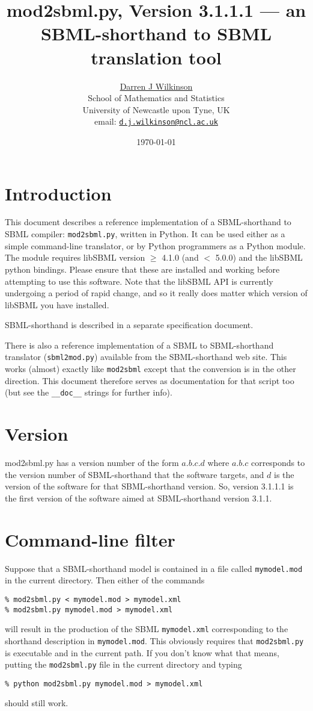 \documentclass[12pt,a4paper]{article}
\title{mod2sbml.py, Version 3.1.1.1 --- an SBML-shorthand to SBML
translation tool}
\author{\href{http://www.staff.ncl.ac.uk/d.j.wilkinson/}{Darren J
Wilkinson}\\
School of Mathematics and Statistics\\
University of Newcastle upon Tyne, UK\\
email: \href{mailto:d.j.wilkinson@ncl.ac.uk}{\texttt{d.j.wilkinson@ncl.ac.uk}}}
\date{\today}
\begin{document}
\sf
\maketitle

\section{Introduction}

This document describes a reference implementation of a SBML-shorthand
to SBML compiler: \verb$mod2sbml.py$, written in Python. It can be
used either as a simple command-line translator, or by Python
programmers as a Python module. The module requires libSBML version
$\geq$ 4.1.0 (and $<$ 5.0.0)
and the libSBML python bindings. Please ensure that these are installed and
working before attempting to use this software. Note that the libSBML
API is currently undergoing a period of rapid change, and so it really
does matter which version of libSBML you have installed.

SBML-shorthand is described in a separate specification document.

There is also a reference implementation of a SBML
to SBML-shorthand translator (\verb$sbml2mod.py$)
available from the
SBML-shorthand web site. This works (almost) exactly like \verb$mod2sbml$
except that the conversion is in the other direction. This document
therefore serves as documentation for that script too (but see the
\verb$__doc__$ strings for further info).

\section{Version}

mod2sbml.py has a version number of the form $a.b.c.d$ where $a.b.c$
corresponds to the version number of SBML-shorthand that the software
targets, and $d$ is the version of the software for that
SBML-shorthand version. So, version 3.1.1.1 is the first version of
the software aimed at SBML-shorthand version 3.1.1.

\section{Command-line filter}

Suppose that a SBML-shorthand model is contained in a file called
\verb$mymodel.mod$ in the current directory. Then either of the commands
\begin{verbatim}
% mod2sbml.py < mymodel.mod > mymodel.xml
% mod2sbml.py mymodel.mod > mymodel.xml
\end{verbatim}
will result in the production of the SBML \verb$mymodel.xml$
corresponding to the shorthand description in \verb$mymodel.mod$. This
obviously requires that \verb$mod2sbml.py$ is executable and in the
current path. If you don't know what that means, putting the
\verb$mod2sbml.py$ file in the current directory and typing
\begin{verbatim}
% python mod2sbml.py mymodel.mod > mymodel.xml
\end{verbatim}
should still work.
\end{document}
